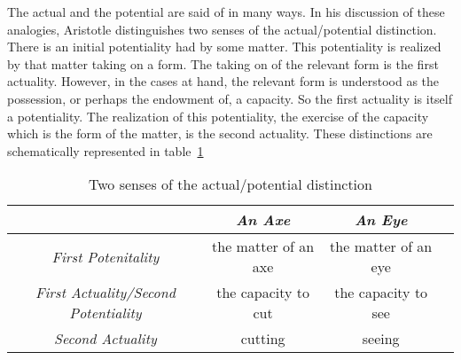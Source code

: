 The actual and the potential are said of in many ways. In his discussion of these analogies, Aristotle distinguishes two senses of the actual/potential distinction. There is an initial potentiality had by some matter. This potentiality is realized by that matter taking on a form. The taking on of the relevant form is the first actuality. However, in the cases at hand, the relevant form is understood as the possession, or perhaps the endowment of, a capacity. So the first actuality is itself a potentiality. The realization of this potentiality, the exercise of the capacity which is the form of the matter, is the second actuality. These distinctions are schematically represented in table~\ref{tab:potential}

\begin{table}[htbp]
	\footnotesize
	\centering
		\begin{tabular}{cccc}
			& \emph{An Axe} & \emph{An Eye}\\
			\hline
			\emph{First Potenitality} & the matter of an axe & the matter of an eye\\
			\hline
			\emph{First Actuality/Second Potentiality} & the capacity to cut & the capacity to see\\
			\hline
			\emph{Second Actuality} & cutting & seeing\\
			\hline
		\end{tabular}
	\caption{Two senses of the actual/potential distinction}
	\label{tab:potential}
\end{table}


